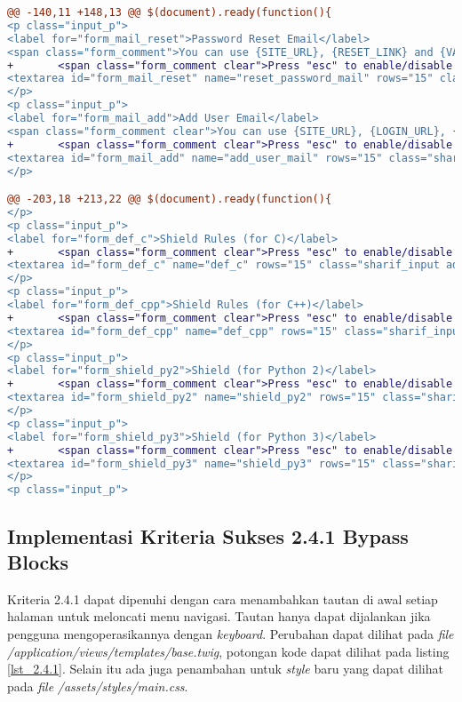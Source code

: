 \begin{lstlisting}[language=diff, caption=Perubahan untuk mematuhi kriteria 2.1.2, label=lst_2.1.2, basicstyle=\ttfamily, frame=single,
columns=fullflexible, keepspaces=true, breaklines=true]
@@ -140,11 +148,13 @@ $(document).ready(function(){
<p class="input_p">
<label for="form_mail_reset">Password Reset Email</label>
<span class="form_comment">You can use {SITE_URL}, {RESET_LINK} and {VALID_TIME}</span><br>
+ 		<span class="form_comment clear">Press "esc" to enable/disable tabindent</span><br>
<textarea id="form_mail_reset" name="reset_password_mail" rows="15" class="sharif_input add_text clear">{{ reset_password_mail }}</textarea>
</p>
<p class="input_p">
<label for="form_mail_add">Add User Email</label>
<span class="form_comment clear">You can use {SITE_URL}, {LOGIN_URL}, {ROLE}, {USERNAME} and {PASSWORD}</span><br>
+ 		<span class="form_comment clear">Press "esc" to enable/disable tabindent</span><br>
<textarea id="form_mail_add" name="add_user_mail" rows="15" class="sharif_input add_text clear">{{ add_user_mail }}</textarea>
</p>

@@ -203,18 +213,22 @@ $(document).ready(function(){
</p>
<p class="input_p">
<label for="form_def_c">Shield Rules (for C)</label>
+ 		<span class="form_comment clear">Press "esc" to enable/disable tabindent</span><br>
<textarea id="form_def_c" name="def_c" rows="15" class="sharif_input add_text clear">{{ defc }}</textarea>
</p>
<p class="input_p">
<label for="form_def_cpp">Shield Rules (for C++)</label>
+ 		<span class="form_comment clear">Press "esc" to enable/disable tabindent</span><br>
<textarea id="form_def_cpp" name="def_cpp" rows="15" class="sharif_input add_text clear">{{ defcpp }}</textarea>
</p>
<p class="input_p">
<label for="form_shield_py2">Shield (for Python 2)</label>
+ 		<span class="form_comment clear">Press "esc" to enable/disable tabindent</span><br>
<textarea id="form_shield_py2" name="shield_py2" rows="15" class="sharif_input add_text clear">{{ shield_py2 }}</textarea>
</p>
<p class="input_p">
<label for="form_shield_py3">Shield (for Python 3)</label>
+ 		<span class="form_comment clear">Press "esc" to enable/disable tabindent</span><br>
<textarea id="form_shield_py3" name="shield_py3" rows="15" class="sharif_input add_text clear">{{ shield_py3 }}</textarea>
</p>
<p class="input_p">
\end{lstlisting}

\subsection{Implementasi Kriteria Sukses 2.4.1 Bypass Blocks}
\label{subsec:implementasi_A_2.4.1}

Kriteria 2.4.1 dapat dipenuhi dengan cara menambahkan tautan di awal setiap halaman untuk meloncati menu navigasi. Tautan hanya dapat dijalankan jika pengguna mengoperasikannya dengan \textit{keyboard}. Perubahan dapat dilihat pada \textit{file} \textit{/application/views/templates/base.twig}, potongan kode dapat dilihat pada listing \ref{lst_2.4.1}. Selain itu ada juga penambahan untuk \textit{style} baru yang dapat dilihat pada \textit{file} \textit{/assets/styles/main.css}.

